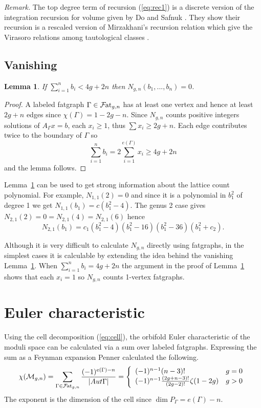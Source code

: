 \documentclass{amsart}
\newtheorem{lemma}{Lemma}
\newcommand{\modm}{\mathcal{M}}
\newcommand{\f}{\mathcal{F}}
\newcommand{\fat}{\f\hspace{-.3mm}{\rm at}_{g,n}}
\begin{document}
{\em Remark.} The top degree term of recursion (\ref{eq:rec1}) is a discrete version of the integration recursion for volume given by Do and Safnuk \cite{DSaHyp}.  They show their recursion is a rescaled version of Mirzakhani's recursion relation \cite{MirSim} which give the Virasoro relations among tautological classes \cite{MirWei}.

\subsection{Vanishing}   \label{sec:van}
\begin{lemma}   \label{th:van}
If $\displaystyle\sum_{i=1}^nb_i<4g+2n$ then $N_{g,n}(b_1,...,b_n)=0$.
\end{lemma}
\begin{proof}
A labeled fatgraph $\Gamma\in \fat$ has at least one vertex and hence at least $2g+n$ edges since $\chi(\Gamma)=1-2g-n$.  Since $N_{g,n}$ counts positive integers solutions of $A_{\Gamma}x=b$, each $x_i\geq 1$, thus $\sum x_i\geq 2g+n$.  Each edge contributes twice to the boundary of $\Gamma$ so 
\[ \sum_{i=1}^nb_i=2\sum_{i=1}^{e(\Gamma)}x_i\geq 4g+2n\]
and the lemma follows.
\end{proof}
Lemma~\ref{th:van} can be used to get strong information about the lattice count polynomial.  For example, $N_{1,1}(2)=0$ and since it is a polynomial in $b_1^2$ of degree 1 we get $N_{1,1}(b_1)=c(b_1^2-4)$.   The genus 2 case gives $N_{2,1}(2)=0=N_{2,1}(4)=N_{2,1}(6)$ hence
\[ N_{2,1}(b_1)=c_1(b_1^2-4)(b_1^2-16)(b_1^2-36)(b_1^2+c_2).\]

Although it is very difficult to calculate $N_{g,n}$ directly using fatgraphs, in the simplest cases it is calculable by extending the idea behind the vanishing Lemma~\ref{th:van}.  When $\displaystyle\sum_{i=1}^nb_i=4g+2n$ the argument in the proof of Lemma~\ref{th:van} shows that each $x_i=1$ so $N_{g,n}$ counts 1-vertex fatgraphs.

\section{Euler characteristic}  \label{sec:euler}
Using the cell decomposition (\ref{eq:cell}), the orbifold Euler characteristic of the moduli space can be calculated via a sum over labeled fatgraphs.  Expressing the sum as a Feynman expansion
Penner \cite{PenPer} calculated the following.
\[\chi(\modm_{g,n})=\sum_{\Gamma\in \fat}\frac{(-1)^{e(\Gamma)-n}}{|Aut \Gamma|}=\left\{\begin{array}{ll}(-1)^{n-1}(n-3)!&g=0\\(-1)^{n-1}\frac{(2g+n-3)!}{(2g-2)!}\zeta(1-2g)&g>0\end{array}\right.\]
The exponent is the dimension of the cell since $\dim P_{\Gamma}=e(\Gamma)-n$.
\end{document}
